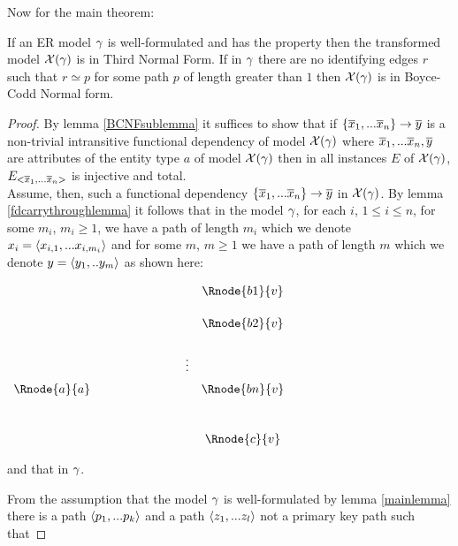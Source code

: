 \noindent Now for the main theorem:\\
\begin{theorem}
\noindent If an ER model $\gamma$ is well-formulated  and has the \fdfactoring property then the 
transformed model $\mathcal{X}(\gamma)$  is in Third Normal Form. If in $\gamma$
there are no identifying edges $r$ such that $r \simeq p$ for some path $p$ of length greater than $1$
then $\mathcal{X}(\gamma)$ is in Boyce-Codd Normal form.
\end{theorem}
\begin{proof}
By lemma \ref{BCNFsublemma} it suffices to show that if 
$\left\{\overline{x}_1,...\overline{x}_n\right\} \rightarrow \overline{y}$ is a non-trivial intransitive functional dependency of model $\mathcal{X}(\gamma)$
where $\overline{x}_1,...\overline{x}_n,\overline{y}$ are attributes of the entity type $a$ of model $\mathcal{X}(\gamma)$ 
then  in all instances
$E$ of $\mathcal{X}(\gamma)$, $E_{<\overline{x}_1,...\overline{x}_n>}$ is injective and total. \\


\noindent Assume, then, such a functional dependency $\left\{\overline{x}_1,...\overline{x}_n\right\} \rightarrow \overline{y}$ in  $\mathcal{X}(\gamma)$. 
By lemma \ref{fdcarrythroughlemma} it follows that in the model $\gamma$, for each $i$, $1 \leq i \leq n$, 
for some $m_i$, $m_i \geq 1$, we have a 
path of length $m_i$ which we denote $x_i = \langle x_{i,1},...x_{i,m_i} \rangle$  and for some $m$, $m \geq 1$ we have a path 
of length $m$ which we denote 
$y=\langle y_1,..y_m \rangle$ as shown here: 
\setlength{\arraycolsep}{.2cm}
\begin{center}
$
\begin{array}{cp{2cm}cc}
             & &         & \Rnode{b1}{v} \\ [0.5cm]
						 & &         & \Rnode{b2}{v} \\ [0.6cm]
						 & & \vdots  &                 \\ [0.2cm]
\Rnode{a}{a} & &         & \Rnode{bn}{v} \\ [1.0cm]
             & &         & \Rnode{c}{v}   \\
\end{array}
$
\end{center}
and that  in $\gamma$.

From the assumption that the model $\gamma$ is well-formulated 
by lemma \ref{mainlemma} there is a path $\langle p_1,...p_k\rangle$
and a path $\langle z_1,...z_l\rangle$ not a primary key path such that


\end{proof}
